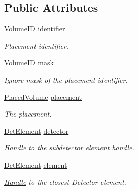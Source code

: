 \subsection*{Public Attributes}
\begin{DoxyCompactItemize}
\item 
VolumeID \hyperlink{class_d_d4hep_1_1_geometry_1_1_volume_manager_context_a22e82a0219d1d0249ea2d1b034ef7264}{identifier}
\begin{DoxyCompactList}\small\item\em Placement identifier. \item\end{DoxyCompactList}\item 
VolumeID \hyperlink{class_d_d4hep_1_1_geometry_1_1_volume_manager_context_a052bc7df447cef84eabe15a5751e772b}{mask}
\begin{DoxyCompactList}\small\item\em Ignore mask of the placement identifier. \item\end{DoxyCompactList}\item 
\hyperlink{class_d_d4hep_1_1_geometry_1_1_placed_volume}{PlacedVolume} \hyperlink{class_d_d4hep_1_1_geometry_1_1_volume_manager_context_aa6c87ac47a16aa5094ca87d5991ab91f}{placement}
\begin{DoxyCompactList}\small\item\em The placement. \item\end{DoxyCompactList}\item 
\hyperlink{class_d_d4hep_1_1_geometry_1_1_det_element}{DetElement} \hyperlink{class_d_d4hep_1_1_geometry_1_1_volume_manager_context_a4b637a36900149ff3490731f62ca1d52}{detector}
\begin{DoxyCompactList}\small\item\em \hyperlink{class_d_d4hep_1_1_handle}{Handle} to the subdetector element handle. \item\end{DoxyCompactList}\item 
\hyperlink{class_d_d4hep_1_1_geometry_1_1_det_element}{DetElement} \hyperlink{class_d_d4hep_1_1_geometry_1_1_volume_manager_context_a57c697291054cc0fa221f047dd32938f}{element}
\begin{DoxyCompactList}\small\item\em \hyperlink{class_d_d4hep_1_1_handle}{Handle} to the closest Detector element. \item\end{DoxyCompactList}\item 

\end{DoxyCompactItemize}
